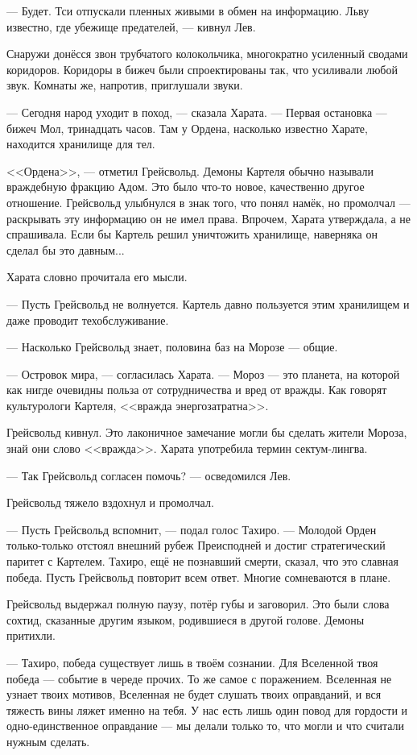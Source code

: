 --- Будет.
Тси отпускали пленных живыми в обмен на информацию.
Льву известно, где убежище предателей, --- кивнул Лев.

Снаружи донёсся звон трубчатого колокольчика, многократно усиленный сводами коридоров.
Коридоры в бижеч были спроектированы так, что усиливали любой звук.
Комнаты же, напротив, приглушали звуки.

--- Сегодня народ уходит в поход, --- сказала Харата.
--- Первая остановка --- бижеч Мол, тринадцать часов.
Там у Ордена, насколько известно Харате, находится хранилище для тел.

<<Ордена>>, --- отметил Грейсвольд.
Демоны Картеля обычно называли враждебную фракцию Адом.
Это было что-то новое, качественно другое отношение.
Грейсвольд улыбнулся в знак того, что понял намёк, но промолчал --- раскрывать эту информацию он не имел права.
Впрочем, Харата утверждала, а не спрашивала.
Если бы Картель решил уничтожить хранилище, наверняка он сделал бы это давным...

Харата словно прочитала его мысли.

--- Пусть Грейсвольд не волнуется.
Картель давно пользуется этим хранилищем и даже проводит техобслуживание.

--- Насколько Грейсвольд знает, половина баз на Морозе --- общие.

--- Островок мира, --- согласилась Харата.
--- Мороз --- это планета, на которой как нигде очевидны польза от сотрудничества и вред от вражды.
Как говорят культурологи Картеля, <<вражда энергозатратна>>.

Грейсвольд кивнул.
Это лаконичное замечание могли бы сделать жители Мороза, знай они слово <<вражда>>.
Харата употребила термин сектум-лингва.

--- Так Грейсвольд согласен помочь? --- осведомился Лев.

Грейсвольд тяжело вздохнул и промолчал.

--- Пусть Грейсвольд вспомнит, --- подал голос Тахиро.
--- Молодой Орден только-только отстоял внешний рубеж Преисподней и достиг стратегический паритет с Картелем.
Тахиро, ещё не познавший смерти, сказал, что это славная победа.
Пусть Грейсвольд повторит всем ответ.
Многие сомневаются в плане.

Грейсвольд выдержал полную паузу, потёр губы и заговорил.
Это были слова сохтид, сказанные другим языком, родившиеся в другой голове.
Демоны притихли.

--- Тахиро, победа существует лишь в твоём сознании.
Для Вселенной твоя победа --- событие в череде прочих.
То же самое с поражением.
Вселенная не узнает твоих мотивов, Вселенная не будет слушать твоих оправданий, и вся тяжесть вины ляжет именно на тебя.
У нас есть лишь один повод для гордости и одно-единственное оправдание --- мы делали только то, что могли и что считали нужным сделать.

